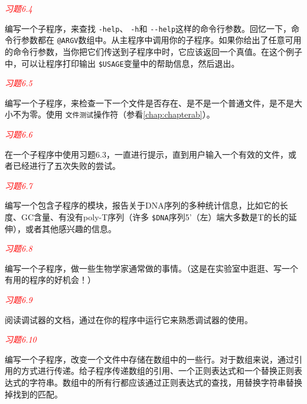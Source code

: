 \textcolor{red}{\textit{习题6.4}}
\begin{adjustwidth}{4em}{}
编写一个子程序，来查找 \verb|-help|、 \verb|-h|和 \verb|--help|这样的命令行参数。回忆一下，命令行参数都在 \verb|@ARGV|数组中。从主程序中调用你的子程序。如果你给出了任意可用的命令行参数，当你把它们传送到子程序中时，它应该返回一个真值。在这个例子中，可以让程序打印输出 \verb|$USAGE|变量中的帮助信息，然后退出。
\end{adjustwidth}

\textcolor{red}{\textit{习题6.5}}
\begin{adjustwidth}{4em}{}
编写一个子程序，来检查一下一个文件是否存在、是不是一个普通文件，是不是大小不为零。使用 \verb|文件测试|操作符（参看\autoref{chap:chapterab}）。
\end{adjustwidth}

\textcolor{red}{\textit{习题6.6}}
\begin{adjustwidth}{4em}{}
在一个子程序中使用习题6.3，一直进行提示，直到用户输入一个有效的文件，或者已经进行了五次失败的尝试。
\end{adjustwidth}

\textcolor{red}{\textit{习题6.7}}
\begin{adjustwidth}{4em}{}
编写一个包含子程序的模块，报告关于DNA序列的多种统计信息，比如它的长度、GC含量、有没有poly-T序列（许多 \verb|$DNA|序列5'（左）端大多数是T的长的延伸），或者其他感兴趣的信息。
\end{adjustwidth}

\textcolor{red}{\textit{习题6.8}}
\begin{adjustwidth}{4em}{}
编写一个子程序，做一些生物学家通常做的事情。（这是在实验室中逛逛、写一个有用的程序的好机会！）
\end{adjustwidth}

\textcolor{red}{\textit{习题6.9}}
\begin{adjustwidth}{4em}{}
阅读调试器的文档，通过在你的程序中运行它来熟悉调试器的使用。
\end{adjustwidth}

\textcolor{red}{\textit{习题6.10}}
\begin{adjustwidth}{4em}{}
编写一个子程序，改变一个文件中存储在数组中的一些行。对于数组来说，通过引用的方式进行传递。给子程序传递数组的引用、一个正则表达式和一个替换正则表达式的字符串。数组中的所有行都应该通过正则表达式的查找，用替换字符串替换掉找到的匹配。
\end{adjustwidth}
